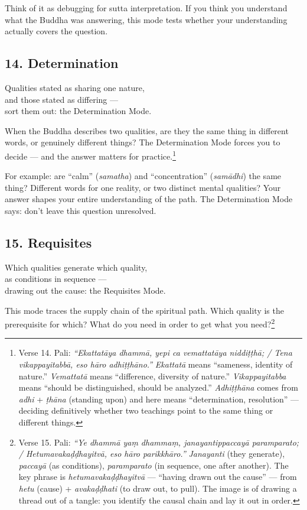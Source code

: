 Think of it as debugging for sutta interpretation. If you think you understand what the Buddha was answering, this mode tests whether your understanding actually covers the question.

\subsection*{14. Determination}

\begin{versebox}
Qualities stated as sharing one nature,\\
and those stated as differing ---\\
sort them out: the Determination Mode.
\end{versebox}

When the Buddha describes two qualities, are they the same thing in different words, or genuinely different things? The Determination Mode forces you to decide --- and the answer matters for practice.\footnote{Verse 14. Pali: \textit{``Ekattatāya dhammā, yepi ca vemattatāya niddiṭṭhā; / Tena vikappayitabbā, eso hāro adhiṭṭhāno.''} \textit{Ekattatā} means ``sameness, identity of nature.'' \textit{Vemattatā} means ``difference, diversity of nature.'' \textit{Vikappayitabba} means ``should be distinguished, should be analyzed.'' \textit{Adhiṭṭhāna} comes from \textit{adhi} + \textit{ṭhāna} (standing upon) and here means ``determination, resolution'' --- deciding definitively whether two teachings point to the same thing or different things.}

For example: are ``calm'' (\textit{samatha}) and ``concentration'' (\textit{samādhi}) the same thing? Different words for one reality, or two distinct mental qualities? Your answer shapes your entire understanding of the path. The Determination Mode says: don't leave this question unresolved.

\subsection*{15. Requisites}

\begin{versebox}
Which qualities generate which quality,\\
as conditions in sequence ---\\
drawing out the cause: the Requisites Mode.
\end{versebox}

This mode traces the supply chain of the spiritual path. Which quality is the prerequisite for which? What do you need in order to get what you need?\footnote{Verse 15. Pali: \textit{``Ye dhammā yaṃ dhammaṃ, janayantippaccayā paramparato; / Hetumavakaḍḍhayitvā, eso hāro parikkhāro.''} \textit{Janayanti} (they generate), \textit{paccayā} (as conditions), \textit{paramparato} (in sequence, one after another). The key phrase is \textit{hetumavakaḍḍhayitvā} --- ``having drawn out the cause'' --- from \textit{hetu} (cause) + \textit{avakaḍḍhati} (to draw out, to pull). The image is of drawing a thread out of a tangle: you identify the causal chain and lay it out in order.}


